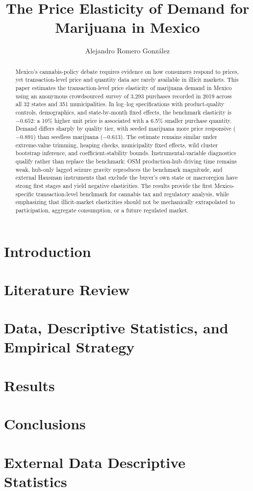 \documentclass{article}
\title{The Price Elasticity of Demand for Marijuana in Mexico}
\author{Alejandro Romero Gonz\'{a}lez}
\begin{document}
\maketitle

\begin{abstract}
Mexico's cannabis-policy debate requires evidence on how consumers respond to prices, yet transaction-level price and quantity data are rarely available in illicit markets.  This paper estimates the transaction-level price elasticity of marijuana demand in Mexico using an anonymous crowdsourced survey of 3{,}293 purchases recorded in 2019 across all 32 states and 351 municipalities.  In log--log specifications with product-quality controls, demographics, and state-by-month fixed effects, the benchmark elasticity is $-0.652$: a 10\% higher unit price is associated with a 6.5\% smaller purchase quantity.  Demand differs sharply by quality tier, with seeded marijuana more price responsive ($-0.891$) than seedless marijuana ($-0.613$).  The estimate remains similar under extreme-value trimming, heaping checks, municipality fixed effects, wild cluster bootstrap inference, and coefficient-stability bounds.  Instrumental-variable diagnostics qualify rather than replace the benchmark: OSM production-hub driving time remains weak, hub-only lagged seizure gravity reproduces the benchmark magnitude, and external Hausman instruments that exclude the buyer's own state or macroregion have strong first stages and yield negative elasticities.  The results provide the first Mexico-specific transaction-level benchmark for cannabis tax and regulatory analysis, while emphasizing that illicit-market elasticities should not be mechanically extrapolated to participation, aggregate consumption, or a future regulated market.
\end{abstract}

\section{Introduction}\label{sec:intro}


\section{Literature Review}\label{sec:litreview}


\section{Data, Descriptive Statistics, and Empirical Strategy}\label{sec:data}


\section{Results}\label{sec:results}


\section{Conclusions}\label{sec:conclusions}


\clearpage
\appendix
\section{External Data Descriptive Statistics}\label{app:external-data}


\printbibliography
\end{document}
